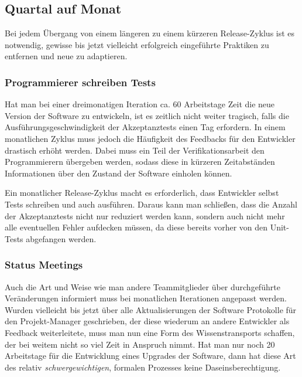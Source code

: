 \subsection{Quartal auf Monat}
\label{subsec:quartal-auf-monat}

Bei jedem Übergang von einem längeren zu einem kürzeren Release-Zyklus ist es
notwendig, gewisse bis jetzt vielleicht erfolgreich eingeführte Praktiken zu
entfernen und neue zu adaptieren.

\subsubsection{Programmierer schreiben Tests}
\label{minisec:programmierer-schreiben-tests}
Hat man bei einer dreimonatigen Iteration ca. 60 Arbeitstage Zeit die neue
Version der Software zu entwickeln, ist es zeitlich nicht weiter tragisch,
falls die Ausführungsgeschwindigkeit der Akzeptanztests einen Tag erfordern.
In einem monatlichen Zyklus muss jedoch die Häufigkeit des Feedbacks für den
Entwickler drastisch erhöht werden. Dabei muss ein Teil der
Verifikationsarbeit den Programmierern übergeben werden, sodass diese in
kürzeren Zeitabständen Informationen über den Zustand der Software einholen
können.

Ein monatlicher Release-Zyklus macht es erforderlich, dass Entwickler selbst
Tests schreiben und auch ausführen. Daraus kann man schließen, dass die Anzahl
der Akzeptanztests nicht nur reduziert werden kann, sondern auch nicht mehr
alle eventuellen Fehler aufdecken müssen, da diese bereits vorher von den
Unit-Tests abgefangen werden.

\subsubsection{Status Meetings}
\label{minisec:status-meetings}

Auch die Art und Weise wie man andere Teammitglieder über durchgeführte
Veränderungen informiert muss bei monatlichen Iterationen angepasst werden.
Wurden vielleicht bis jetzt über alle Aktualisierungen der Software Protokolle
für den Projekt-Manager geschrieben, der diese wiederum an andere Entwickler
als Feedback weiterleitete, muss man nun eine Form des Wissenstransports
schaffen, der bei weitem nicht so viel Zeit in Anspruch nimmt. Hat man nur
noch 20 Arbeitstage für die Entwicklung eines Upgrades der Software, dann hat
diese Art des relativ \emph{schwergewichtigen}, formalen Prozesses keine
Daseinsberechtigung.

